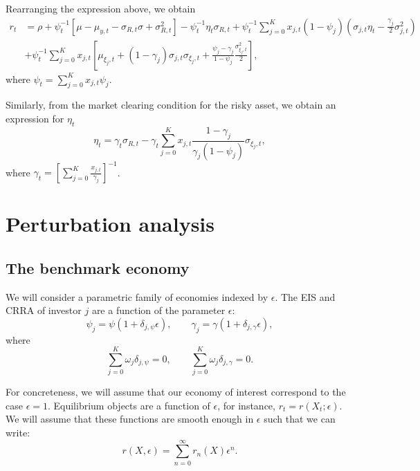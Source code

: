 \documentclass[11pt,english]{article}
\begin{document}
Rearranging the expression above, we obtain
\begin{align}
    r_t &= \rho + \psi_t^{-1} \left[ \mu - \mu_{y,t} - \sigma_{R,t} \sigma  + \sigma_{R,t}^2\right] - \psi_t^{-1}\eta_t \sigma_{R,t} + \psi_t^{-1}\sum_{j=0}^K x_{j,t}   (1-\psi_j) \left( \sigma_{j,t} \eta_t - \frac{\gamma_j}{2}  \sigma_{j,t}^2    \right)  \nonumber\\
    &+ \psi_t^{-1}\sum_{j=0}^K x_{j,t} \left[ \mu_{\xi_j,t} 
    + (1-\gamma_j) \sigma_{j,t} \sigma_{\xi_j,t}
    + \frac{\psi_j - \gamma_j}{1-\psi_j} \frac{\sigma_{\xi_j,t}^2}{2} \right],
\end{align}
where $\psi_t = \sum_{j=0}^K x_{j,t} \psi_j$.

Similarly, from the market clearing condition for the risky asset, we obtain an expression for $\eta_t$
\begin{equation*}
    \boxed{\eta_t = \gamma_t \sigma_{R,t} - \gamma_t \sum_{j=0}^K x_{j,t} \frac{1-\gamma_j}{\gamma_j (1-\psi_j)} \sigma_{\xi_j,t}, }
\end{equation*}
where $\gamma_t = \left[ \sum_{j=0}^K \frac{x_{j,t}}{\gamma_j}  \right]^{-1}$.

\section{Perturbation analysis}

\subsection{The benchmark economy}

We will consider a parametric family of economies indexed by $\epsilon$. The EIS and CRRA of investor $j$ are a function of the parameter $\epsilon$:
\begin{equation}
    \psi_j = \psi\left(1 + \delta_{j,\psi} \epsilon\right), \qquad 
    \gamma_j = \gamma\left(1 + \delta_{j,\gamma} \epsilon\right),
\end{equation}
where
\begin{equation}
    \sum_{j=0}^K \omega_j \delta_{j,\psi} = 0, \qquad \sum_{j=0}^K \omega_j \delta_{j,\gamma} = 0.
\end{equation}

For concreteness, we will assume that our economy of interest correspond to the case $\epsilon=1$. 
Equilibrium objects are a function of $\epsilon$, for instance, $r_t = r(X_t;\epsilon)$. We will assume that these functions are smooth enough in $\epsilon$ such that we can write:
\begin{equation}
    r(X,\epsilon) = \sum_{n=0}^\infty r_n(X) \epsilon^n.
\end{equation}
\end{document}
